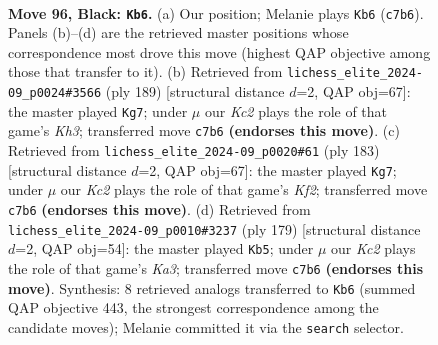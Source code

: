 \documentclass[11pt]{article}
\begin{document}
\clearpage

\begin{figure}[p]\centering
\begin{subfigure}{0.46\textwidth}\centering
\resizebox{\linewidth}{!}{%
\newchessgame
\chessboard[
  setfen={8/2k3R1/8/8/7r/8/5K2/r7 b - - 3 96},
  showmover=false,
  pgfstyle=straightmove, color=movearrow, markmove={c7-b6}
]}
\caption{}
\end{subfigure}\hfill
\begin{subfigure}{0.46\textwidth}\centering
\resizebox{\linewidth}{!}{%
\newchessgame
\chessboard[
  setfen={5r2/8/7k/8/4K3/8/7R/8 b - - 27 95},
  showmover=false,
  pgfstyle=straightmove, color=movearrow, markmove={h6-g7}
]}
\caption{}
\end{subfigure}
\\[4pt]
\begin{subfigure}{0.46\textwidth}\centering
\resizebox{\linewidth}{!}{%
\newchessgame
\chessboard[
  setfen={8/5k2/8/8/8/5R2/K7/6r1 b - - 57 92},
  showmover=false,
  pgfstyle=straightmove, color=movearrow, markmove={f7-g7}
]}
\caption{}
\end{subfigure}\hfill
\begin{subfigure}{0.46\textwidth}\centering
\resizebox{\linewidth}{!}{%
\newchessgame
\chessboard[
  setfen={2r5/8/k2K4/8/8/8/8/R7 b - - 3 90},
  showmover=false,
  pgfstyle=straightmove, color=movearrow, markmove={a6-b5}
]}
\caption{}
\end{subfigure}
\caption{\textbf{Move 96, Black: \texttt{Kb6}.} (a) Our position; Melanie plays \texttt{Kb6} (\texttt{c7b6}). Panels (b)--(d) are the retrieved master positions whose correspondence most drove this move (highest QAP objective among those that transfer to it). (b) Retrieved from \texttt{lichess\_elite\_2024-09\_p0024\#3566} (ply 189) [structural distance $d$=2, QAP obj=67]: the master played \texttt{Kg7}; under $\mu$ our \emph{Kc2} plays the role of that game's \emph{Kh3}; transferred move \texttt{c7b6} \textbf{(endorses this move)}. (c) Retrieved from \texttt{lichess\_elite\_2024-09\_p0020\#61} (ply 183) [structural distance $d$=2, QAP obj=67]: the master played \texttt{Kg7}; under $\mu$ our \emph{Kc2} plays the role of that game's \emph{Kf2}; transferred move \texttt{c7b6} \textbf{(endorses this move)}. (d) Retrieved from \texttt{lichess\_elite\_2024-09\_p0010\#3237} (ply 179) [structural distance $d$=2, QAP obj=54]: the master played \texttt{Kb5}; under $\mu$ our \emph{Kc2} plays the role of that game's \emph{Ka3}; transferred move \texttt{c7b6} \textbf{(endorses this move)}. Synthesis: 8 retrieved analogs transferred to \texttt{Kb6} (summed QAP objective 443, the strongest correspondence among the candidate moves); Melanie committed it via the \texttt{search} selector.}
\label{fig:thought-m191}
\end{figure}
\end{document}

